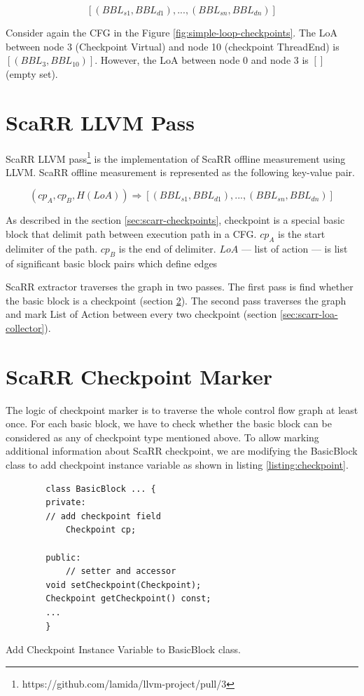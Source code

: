 $$[(BBL_{s1},BBL_{d1}),...,(BBL_{sn},BBL_{dn})]$$

Consider again the CFG in the Figure \ref{fig:simple-loop-checkpoints}. The LoA between node 3 (Checkpoint Virtual) and node 10 (checkpoint ThreadEnd) is  $[(BBL_3, BBL_{10})]$. However, the LoA between node 0 and node 3 is $[]$ (empty set).

\section{ScaRR LLVM Pass} 

ScaRR LLVM pass\footnote{https://github.com/lamida/llvm-project/pull/3} is the implementation of ScaRR offline measurement using LLVM. ScaRR offline measurement is represented as the following key-value pair.

$$(cp_A, cp_B, H(LoA)) \Rightarrow [(BBL_{s1}, BBL_{d1}), ..., (BBL_{sn}, BBL_{dn})]$$

As described in the section \ref{sec:scarr-checkpoints}, checkpoint is a special basic block that delimit path between execution path in a CFG. $cp_A$ is the start delimiter of the path. $cp_B$ is the end of delimiter. $LoA$ — list of action — is list of significant basic block pairs which define edges 

ScaRR extractor traverses the graph in two passes. The first pass is find whether the basic block is a checkpoint (section \ref{sec:scarr-checkpoint-marker}). The second pass traverses the graph and mark List of Action between every two checkpoint (section \ref{sec:scarr-loa-collector}). 

\section{ScaRR Checkpoint Marker} \label{sec:scarr-checkpoint-marker}

The logic of checkpoint marker is to traverse the whole control flow graph at least once. For each basic block, we have to check whether the basic block can be considered as any of checkpoint type mentioned above. To allow marking additional information about ScaRR checkpoint, we are modifying the BasicBlock class to add checkpoint instance variable as shown in listing \ref{listing:checkpoint}.

\begin{listing}[htbp]
    \begin{verbatim}
        class BasicBlock ... {
        private:
        // add checkpoint field
            Checkpoint cp;

        public:
            // setter and accessor
        void setCheckpoint(Checkpoint);
        Checkpoint getCheckpoint() const;
        ...
        }
    \end{verbatim}
    \caption{Add Checkpoint Instance Variable to BasicBlock class.}    
    \label{listing:checkpoint}
\end{listing}

